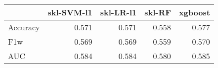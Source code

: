 \begin{tabular}{lrrrr}
\toprule
{} &  skl-SVM-l1 &  skl-LR-l1 &  skl-RF &  xgboost \\
\midrule
Accuracy &       0.571 &      0.571 &   0.558 &    0.577 \\
F1w      &       0.569 &      0.569 &   0.559 &    0.570 \\
AUC      &       0.584 &      0.584 &   0.580 &    0.585 \\
\bottomrule
\end{tabular}
